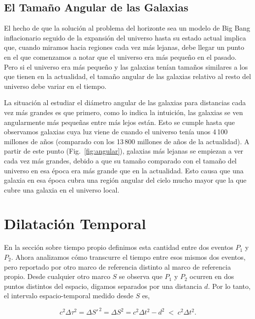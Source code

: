 

\subsection{El Tamaño Angular de las Galaxias}

El hecho de que la solución al problema del horizonte sea un modelo de Big Bang inflacionario seguido de la expansión del universo hasta su estado actual implica que, cuando miramos hacia regiones cada vez más lejanas, debe llegar un punto en el que comenzamos a notar que el universo era más pequeño en el pasado. Pero si el universo era más pequeño y las galaxias tenían tamaños similares a los que tienen en la actualidad, el tamaño angular de las galaxias relativo al resto del universo debe variar en el tiempo.

La situación al estudiar el diámetro angular de las galaxias para distancias cada vez más grandes es que primero, como lo indica la intuición, las galaxias se ven angularmente más pequeñas entre más lejos están. Esto se cumple hasta que observamos galaxias cuya luz viene de cuando el universo tenía unos 4\,100 millones de años (comparado con los 13\,800 millones de años de la actualidad). A partir de este punto (Fig.~\ref{fig:angular}), galaxias más lejanas se empiezan a ver cada vez más grandes, debido a que su tamaño comparado con el tamaño del universo en esa época era más grande que en la actualidad. Esto causa que una galaxia en esa época cubra una región angular del cielo mucho mayor que la que cubre una galaxia en el universo local.



\section{Dilatación Temporal}

En la sección sobre tiempo propio definimos esta cantidad entre dos eventos $P_1$ y $P_2$. Ahora analizamos cómo transcurre el tiempo entre esos mismos dos eventos, pero reportado por otro marco de referencia distinto al marco de referencia propio. Desde cualquier otro marco $S$ se observa que $P_1$ y $P_2$ ocurren en dos puntos distintos del espacio, digamos separados por una distancia $d$. Por lo tanto, el intervalo espacio-temporal medido desde $S$ es,

$$
c^2\Delta\tau^2 = \Delta S'^{\,2} = \Delta S^2 = c^2\Delta t^2 - d^2 \;<\; c^2\Delta t^2 .
$$

